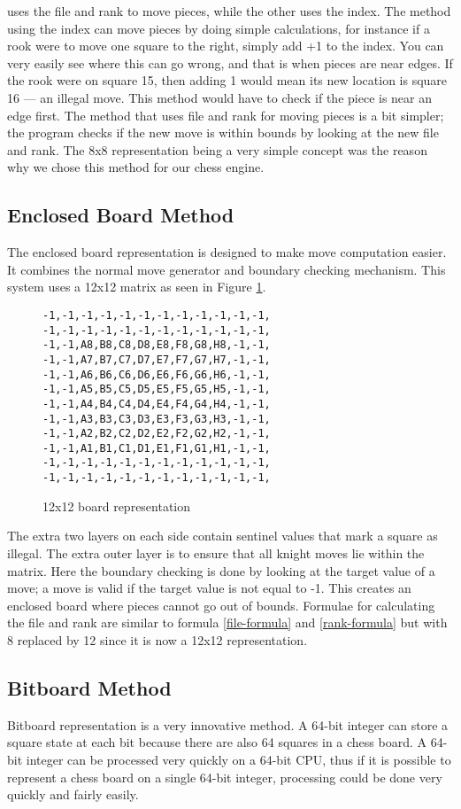 \documentclass[11pt,letterpaper,twocolumn]{article}
\begin{document}
uses the file and rank to move pieces, while the other uses the index. The method using the index can move pieces by doing simple calculations, for instance if a
rook were to move one square to the right, simply add +1 to the index. You can very easily see where this can go wrong, and that is when pieces are near edges.
If the rook were on square 15, then adding 1 would mean its new location is square 16 --- an illegal move. This method would have to check if the piece is near an edge
first. The method that uses file and rank for moving pieces is a bit simpler; the program checks if the new move is within bounds by looking at the new file and rank.
The 8x8 representation being a very simple concept was the reason why we chose this method for our chess engine.

\subsection{Enclosed Board Method}
The enclosed board representation is designed to make move computation easier. It combines the normal move generator and boundary checking mechanism. This system
uses a 12x12 matrix as seen in Figure \ref{board12x12-rep}.
\begin{figure}[h] %
  \caption{12x12 board representation}
  \begin{verbatim}
-1,-1,-1,-1,-1,-1,-1,-1,-1,-1,-1,-1,
-1,-1,-1,-1,-1,-1,-1,-1,-1,-1,-1,-1,
-1,-1,A8,B8,C8,D8,E8,F8,G8,H8,-1,-1,
-1,-1,A7,B7,C7,D7,E7,F7,G7,H7,-1,-1,
-1,-1,A6,B6,C6,D6,E6,F6,G6,H6,-1,-1,
-1,-1,A5,B5,C5,D5,E5,F5,G5,H5,-1,-1,
-1,-1,A4,B4,C4,D4,E4,F4,G4,H4,-1,-1,
-1,-1,A3,B3,C3,D3,E3,F3,G3,H3,-1,-1,
-1,-1,A2,B2,C2,D2,E2,F2,G2,H2,-1,-1,
-1,-1,A1,B1,C1,D1,E1,F1,G1,H1,-1,-1,
-1,-1,-1,-1,-1,-1,-1,-1,-1,-1,-1,-1,
-1,-1,-1,-1,-1,-1,-1,-1,-1,-1,-1,-1, 
  \end{verbatim}
  \label{board12x12-rep}
\end{figure}
The extra two layers on each side contain sentinel values that mark a square as illegal. The extra outer layer is to ensure that all knight moves lie within the matrix.
Here the boundary checking is done by looking at the target value of a move; a move is valid if the target value is not equal to -1. This creates an enclosed board where
pieces cannot go out of bounds. Formulae for calculating the file and rank are similar to formula \ref{file-formula} and \ref{rank-formula} but with 8 replaced by
12 since it is now a 12x12 representation.

\subsection{Bitboard Method}
Bitboard representation is a very innovative method. A 64-bit integer can store a square state at each bit because there are also 64 squares in a chess board.
A 64-bit integer can be processed very quickly on a 64-bit CPU, thus if it is possible to represent a chess board on a single 64-bit integer, processing could be done
very quickly and fairly easily.
\end{document}
